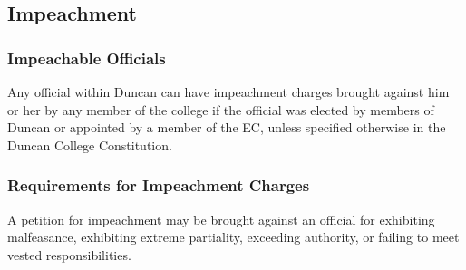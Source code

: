 \documentclass[USletter,12pt]{article}
\begin{document}
\subsection{Impeachment}


\subsubsection{Impeachable Officials}
Any official within Duncan can have impeachment charges brought against him or her by any member of the college if the official was elected by members of Duncan or appointed by a member of the EC, unless specified otherwise in the Duncan College Constitution.

\subsubsection{Requirements for Impeachment Charges}
A petition for impeachment may be brought against an official for exhibiting malfeasance, exhibiting extreme partiality, exceeding authority, or failing to meet vested responsibilities.
\end{document}
